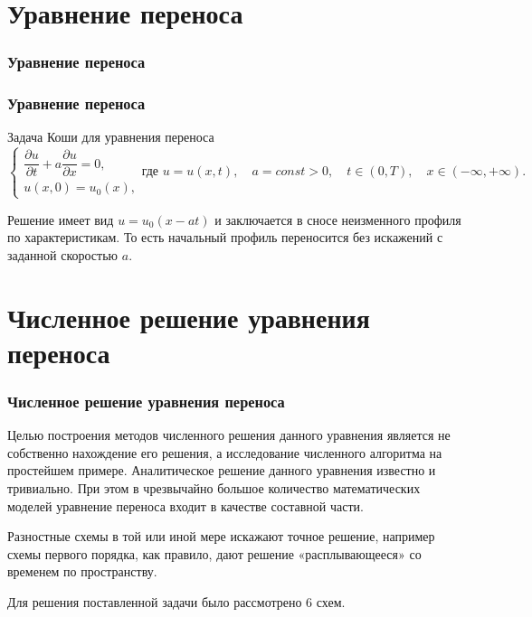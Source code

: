 \documentclass{beamer}
\begin{document}
\section{Уравнение переноса}
\frametitle{Уравнение переноса}
\begin{frame}
\frametitle{Уравнение переноса}
	\begin{block}{Задача Коши для уравнения переноса}
		\begin{equation}
			\begin{cases}
				\dfrac{\partial u}{\partial t} + a\dfrac{\partial u}{\partial x} = 0, \\
				u(x, 0) = u_0(x),
			\end{cases} 
			\text{где } u = u(x, t), \quad a = const > 0, \quad t \in (0, T), \quad x \in (-\infty, +\infty) .
		\end{equation}
		
		Решение имеет вид $u = u_0(x-at)$ и заключается в сносе неизменного профиля по характеристикам. То есть начальный профиль переносится без искажений с заданной скоростью $a$.
	\end{block}
\end{frame}

\section{Численное решение уравнения переноса}
\begin{frame}
\frametitle{Численное решение уравнения переноса}
\begin{block}{}
	Целью построения методов численного решения данного уравнения является не собственно нахождение его решения, а исследование численного алгоритма на простейшем примере. Аналитическое решение данного уравнения известно и тривиально. При этом в чрезвычайно большое количество математических моделей уравнение переноса входит в качестве составной части.
	
	Разностные схемы в той или иной мере искажают точное решение, например схемы первого порядка, как правило, дают решение «расплывающееся» со временем по пространству. 
	
	
	
	
\end{block}
\begin{block}{}
	Для решения поставленной задачи было рассмотрено 6 схем.
\end{block}
\end{frame}
\end{document}
